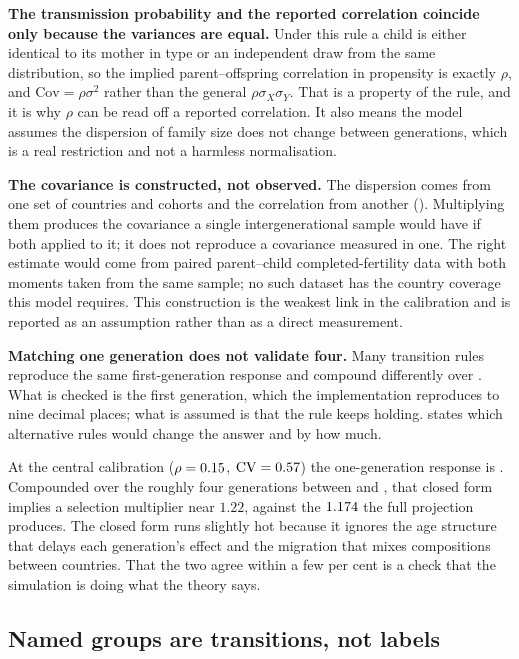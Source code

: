 \textbf{The transmission probability and the reported correlation coincide only
because the variances are equal.} Under this rule a child is either identical to
its mother in type or an independent draw from the same distribution, so the
implied parent--offspring correlation in propensity is exactly $\rho$, and
$\mathrm{Cov} = \rho\sigma^2$ rather than the general $\rho\sigma_X\sigma_Y$.
That is a property of the rule, and it is why $\rho$ can be read off a reported
correlation. It also means the model assumes the dispersion of family size does
not change between generations, which is a real restriction and not a harmless
normalisation.

\textbf{The covariance is constructed, not observed.} The dispersion comes from
one set of countries and cohorts and the correlation from another
(). Multiplying them produces the covariance a single
intergenerational sample would have if both applied to it; it does not reproduce
a covariance measured in one. The right estimate would come from paired
parent--child completed-fertility data with both moments taken from the same
sample; no such dataset has the country coverage this model requires. This
construction is the weakest link in the calibration and is reported as an
assumption rather than as a direct measurement.

\textbf{Matching one generation does not validate four.} Many transition rules
reproduce the same first-generation response and compound differently over
\ProjectionEndYear{}. What is checked is the first generation, which the
implementation reproduces to nine decimal places; what is assumed is that the
rule keeps holding.  states which alternative rules would
change the answer and by how much.

At the central calibration ($\rho = 0.15{}$, $\mathrm{CV} =
0.57{}$) the one-generation response is \GenerationResponse{}.
Compounded over the roughly four generations between \PhaseFiveBaseYear{} and
\ProjectionEndYear{}, that closed form implies a selection multiplier near
$1.22$, against the $1.174{}$ the full projection produces. The
closed form runs slightly hot because it ignores the age structure that delays
each generation's effect and the migration that mixes compositions between
countries. That the two agree within a few per cent is a check that the
simulation is doing what the theory says.

\subsection{Named groups are transitions, not labels}
\label{sec:named-groups}

